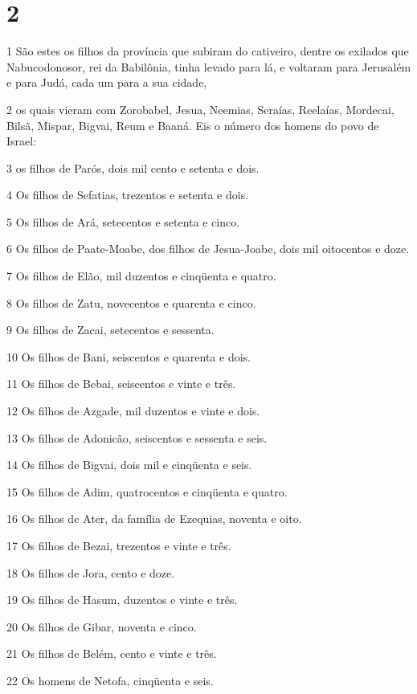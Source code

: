 \chapter{2}

\par 1 São estes os filhos da província que subiram do cativeiro, dentre os exilados que Nabucodonosor, rei da Babilônia, tinha levado para lá, e voltaram para Jerusalém e para Judá, cada um para a sua cidade,
\par 2 os quais vieram com Zorobabel, Jesua, Neemias, Seraías, Reelaías, Mordecai, Bilsã, Mispar, Bigvai, Reum e Baaná. Eis o número dos homens do povo de Israel:
\par 3 os filhos de Parós, dois mil cento e setenta e dois.
\par 4 Os filhos de Sefatias, trezentos e setenta e dois.
\par 5 Os filhos de Ará, setecentos e setenta e cinco.
\par 6 Os filhos de Paate-Moabe, dos filhos de Jesua-Joabe, dois mil oitocentos e doze.
\par 7 Os filhos de Elão, mil duzentos e cinqüenta e quatro.
\par 8 Os filhos de Zatu, novecentos e quarenta e cinco.
\par 9 Os filhos de Zacai, setecentos e sessenta.
\par 10 Os filhos de Bani, seiscentos e quarenta e dois.
\par 11 Os filhos de Bebai, seiscentos e vinte e três.
\par 12 Os filhos de Azgade, mil duzentos e vinte e dois.
\par 13 Os filhos de Adonicão, seiscentos e sessenta e seis.
\par 14 Os filhos de Bigvai, dois mil e cinqüenta e seis.
\par 15 Os filhos de Adim, quatrocentos e cinqüenta e quatro.
\par 16 Os filhos de Ater, da família de Ezequias, noventa e oito.
\par 17 Os filhos de Bezai, trezentos e vinte e três.
\par 18 Os filhos de Jora, cento e doze.
\par 19 Os filhos de Hasum, duzentos e vinte e três.
\par 20 Os filhos de Gibar, noventa e cinco.
\par 21 Os filhos de Belém, cento e vinte e três.
\par 22 Os homens de Netofa, cinqüenta e seis.
